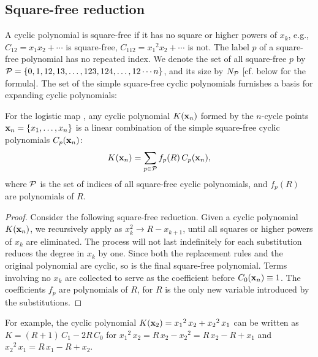 \documentclass{ws-ijbc}
\begin{document}
\subsection{Square-free reduction}




A cyclic polynomial is square-free
  if it has no square or higher powers of $x_k$,
e.g., $C_{12} = x_1 x_2 + \cdots$ is square-free,
  $C_{112} = {x_1}^2 x_2 + \cdots$ is not.
The label $p$ of a square-free polynomial
  has no repeated index.
We denote the set of all square-free $p$ by
$\mathcal P = \{0, 1, 12, 13, \ldots, 123, 124, \ldots, 12\cdots n\}$,
and its size by $N_\mathcal P$ [cf.  below for the formula].
%
%
The set of the simple square-free cyclic polynomials
  furnishes a basis for expanding cyclic polynomials:



\begin{theorem}
  For the logistic map ,
  any cyclic polynomial $K(\mathbf{x}_{n})$
  formed by the $n$-cycle points
  $\mathbf{x}_{n} = \{x_1, \ldots, x_n\}$
  is a linear combination of
  the simple square-free cyclic polynomials $C_p(\mathbf{x}_{n})$:
\[
  K(\mathbf{x}_{n}) = \sum_{p \in \mathcal P} f_p(R) \, C_p(\mathbf{x}_{n}),
\]
  where $\mathcal P$ %
  is the set of indices of all square-free cyclic polynomials,
  and $f_p(R)$ are polynomials of $R$.
  \label{thm:sqrfree}
\end{theorem}
%
%
\begin{proof}
Consider the following square-free reduction.
%
Given a cyclic polynomial $K(\mathbf{x}_{n})$,
  we recursively apply  as
  $x_k^2 \rightarrow R - x_{k+1}$,
  until all squares or higher powers of $x_k$ are eliminated.
The process will not last indefinitely
  for each substitution reduces the degree in $x_k$ %
  by one.
Since both the replacement rules and the original polynomial are cyclic,
  so is the final square-free polynomial.
Terms involving no $x_k$
  are collected to serve as the coefficient before $C_0(\mathbf{x}_{n}) \equiv 1$.
The coefficients $f_p$ are polynomials of $R$,
  for $R$ is the only new variable introduced by the substitutions.
\end{proof}
%
%
For example, the cyclic polynomial
  $K(\mathbf{x}_{2}) = {x_1}^2 \, x_2 + {x_2}^2 \, x_1$
can be written as $K = (R + 1) \, C_{1} - 2 R \, C_0$
for
${x_1}^2 \, x_2 = R \, x_2 - {x_2}^2 = R \, x_2 - R + x_1$ and
${x_2}^2 \, x_1 = R \, x_1 - R + x_2$.
\end{document}
